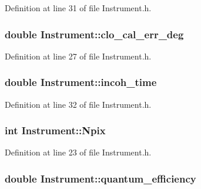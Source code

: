 Definition at line 31 of file Instrument.h.

\hypertarget{classInstrument_a755a26a3b1c7ea48fdcf213371254068}{
\subsubsection[{clo\_\-cal\_\-err\_\-deg}]{\setlength{\rightskip}{0pt plus 5cm}double {\bf Instrument::clo\_\-cal\_\-err\_\-deg}}}
\label{classInstrument_a755a26a3b1c7ea48fdcf213371254068}


Definition at line 27 of file Instrument.h.

\hypertarget{classInstrument_ab431265cc3192bfcc9ceeafd1d30605b}{
\subsubsection[{incoh\_\-time}]{\setlength{\rightskip}{0pt plus 5cm}double {\bf Instrument::incoh\_\-time}}}
\label{classInstrument_ab431265cc3192bfcc9ceeafd1d30605b}


Definition at line 32 of file Instrument.h.

\hypertarget{classInstrument_a349e2122c222f16ed712b5fb8660adb4}{
\subsubsection[{Npix}]{\setlength{\rightskip}{0pt plus 5cm}int {\bf Instrument::Npix}}}
\label{classInstrument_a349e2122c222f16ed712b5fb8660adb4}


Definition at line 23 of file Instrument.h.

\hypertarget{classInstrument_af352575aa1a6bb255db663a53fbb2b8b}{
\subsubsection[{quantum\_\-efficiency}]{\setlength{\rightskip}{0pt plus 5cm}double {\bf Instrument::quantum\_\-efficiency}}}
\label{classInstrument_af352575aa1a6bb255db663a53fbb2b8b}


